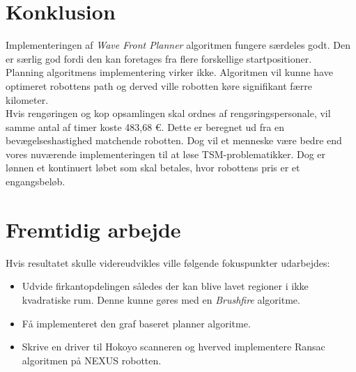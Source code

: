 \section{Konklusion}
\label{sec:kon}
Implementeringen af \emph{Wave Front Planner} algoritmen fungere særdeles godt. Den er særlig god fordi den kan foretages fra flere forskellige startpositioner.\\

Planning algoritmens implementering virker ikke. Algoritmen vil kunne have optimeret robottens path og derved ville robotten køre signifikant færre kilometer. \\

Hvis rengøringen og kop opsamlingen skal ordnes af rengøringspersonale, vil samme antal af timer koste 483,68 €. Dette er beregnet ud fra en bevægelseshastighed matchende robotten. Dog vil et menneske være bedre end vores nuværende implementeringen til at løse TSM-problematikker. Dog er lønnen et kontinuert løbet som skal betales, hvor robottens pris er et engangsbeløb. \\


\section{Fremtidig arbejde}
\label{sec:frem}
Hvis resultatet skulle videreudvikles ville følgende fokuspunkter udarbejdes: 
\begin{itemize}
\item Udvide firkantopdelingen således der kan blive lavet regioner i ikke kvadratiske rum. Denne kunne gøres med en \emph{Brushfire} algoritme.
\item Få implementeret den graf baseret planner algoritme.
\item Skrive en driver til Hokoyo scanneren og hverved implementere Ransac algoritmen på NEXUS robotten.
\end{itemize}

